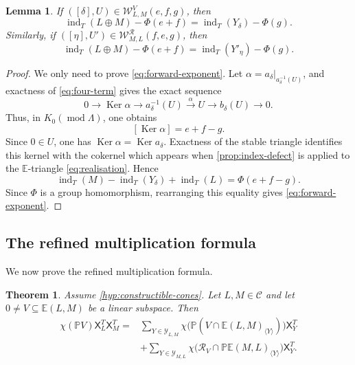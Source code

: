 \documentclass[11pt,reqno]{article}
\numberwithin{equation}{section}
\newtheorem{theorem}{Theorem}[section]
\newtheorem{lemma}[lemma]{Lemma}
\theoremstyle{definition}
\DeclareMathOperator{\Ker}{Ker}
\DeclareMathOperator{\ind}{ind}
\DeclareMathOperator{\modu}{mod}
\newcommand{\C}{\mathcal C}
\newcommand{\E}{\mathbb E}
\newcommand{\X}{\mathsf X}
\newcommand{\xto}[1]{\xrightarrow{#1}}
\begin{document}
\begin{lemma}\label{lem:exponent}
If $([\delta],U)\in\mathcal W^V_{L,M}(e,f,g)$, then
\begin{equation}\label{eq:forward-exponent}
 \ind_T(L\oplus M)-\Phi(e+f)
 =\ind_T(Y_\delta)-\Phi(g).
\end{equation}
Similarly, if $([\eta],U')\in\mathcal W^{\mathcal R}_{M,L}(f,e,g)$, then
\begin{equation}\label{eq:reverse-exponent}
 \ind_T(L\oplus M)-\Phi(e+f)
 =\ind_T(Y'_\eta)-\Phi(g).
\end{equation}
\end{lemma}

\begin{proof}
We only need to prove \eqref{eq:forward-exponent}.  Let
$\alpha=a_\delta|_{a_\delta^{-1}(U)}$, and exactness of
\eqref{eq:four-term} gives the exact sequence
\[
 0\longrightarrow\Ker\alpha\longrightarrow
 a_\delta^{-1}(U)\xto{\alpha}U
 \longrightarrow b_\delta(U)\longrightarrow0.
\]
Thus, in $K_0(\modu\Lambda)$, one obtains
\[
 [\Ker\alpha]=e+f-g.
\]
Since $0\in U$, one has $\Ker\alpha=\Ker a_\delta$. Exactness of the stable triangle identifies this kernel with the cokernel which appears when \cref{prop:index-defect} is applied to the $\E$-triangle \eqref{eq:realisation}.  Hence
\[
 \ind_T(M)-\ind_T(Y_\delta)+\ind_T(L)
 =\Phi(e+f-g).
\]
Since $\Phi$ is a group homomorphism, rearranging this equality gives \eqref{eq:forward-exponent}.
\end{proof}


\subsection{The refined multiplication formula}\label{sec:main}

We now prove the refined multiplication formula.

\begin{theorem}\label{thm:main}
Assume \cref{hyp:constructible-cones}.  Let $L,M\in\C$ and let
$0\neq V\subseteq\E(L,M)$ be a linear subspace.  Then
\begin{equation}\label{eq:main}
\begin{aligned}
 \chi(\mathbb PV)\X^T_L\X^T_M
 ={}&\sum_{Y\in\mathcal Y_{L,M}}
 \chi\bigl(\mathbb P(V\cap\E(L,M)_{\langle Y\rangle})\bigr)\X^T_Y\\
 &+\sum_{Y\in\mathcal Y_{M,L}}
 \chi\bigl(\mathcal R_V\cap
   \mathbb P\E(M,L)_{\langle Y\rangle}\bigr)\X^T_Y.
\end{aligned}
\end{equation}
\end{theorem}
\end{document}

